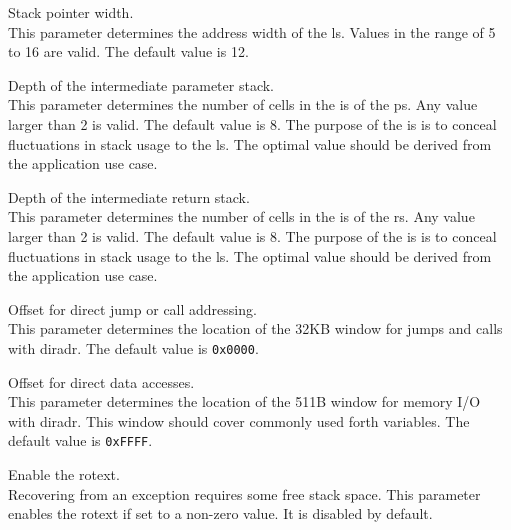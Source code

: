 \begin{description}[style=nextline]

\item[\texttt{SP\_WIDTH}] Stack pointer width. \\
  This parameter determines the address width of the \gls{ls}.
  Values in the range of 5 to 16 are valid.
  The default value is 12. 
  
\item[\texttt{IPS\_DEPTH}] Depth of the intermediate parameter stack. \\
  This parameter determines the number of \glspl{cell} in the \gls{is} of the \gls{ps}.
  Any value larger than 2 is valid.
  The default value is 8. 
  The purpose of the \gls{is} is to conceal fluctuations in stack usage to the \gls{ls}.
  The optimal value should be derived from the application use case.

\item[\texttt{IRS\_DEPTH}] Depth of the intermediate return stack. \\
  This parameter determines the number of \glspl{cell} in the \gls{is} of the \gls{rs}.
  Any value larger than 2 is valid.
  The default value is 8. 
  The purpose of the \gls{is} is to conceal fluctuations in stack usage to the \gls{ls}.
  The optimal value should be derived from the application use case.

\item[\texttt{PBUS\_AADR\_OFFSET}] Offset for direct \gls{jump} or \gls{call} addressing. \\
  This parameter determines the location of the 32KB window for \glspl{jump} and \glspl{call}
  with \gls{diradr}.
  The default value is \texttt{0x0000}. 

\item[\texttt{PBUS\_MADR\_OFFSET}] Offset for direct data accesses. \\
  This parameter determines the location of the 511B window for memory I/O with \gls{diradr}.
  This window should cover commonly used \gls{forth} variables. The default value is \texttt{0xFFFF}. 

\item[\texttt{EXT\_ROT}] Enable the \gls{rotext}. \\
  Recovering from an exception requires some free \gls{stack} space.
  This parameter enables the \gls{rotext} if set to a non-zero value. It is disabled by default.

\end{description}

